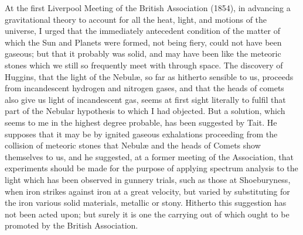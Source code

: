 \documentclass[a4paper, 11pt, oneside, english]{article}
\begin{document}
At the first Liverpool Meeting of the British Association (1854), in advancing a gravitational theory to account for all the heat, light, and motions of the universe, I urged that the immediately antecedent condition of the matter of which the Sun and Planets were formed, not being fiery, could not have been gaseous; but that it probably was solid, and may have been like the meteoric stones which we still so frequently meet with through space. The discovery of Huggins, that the light of the Nebulæ, so far as hitherto sensible to us, proceeds from incandescent hydrogen and nitrogen gases, and that the heads of comets also give us light of incandescent gas, seems at first sight literally to fulfil that part of the Nebular hypothesis to which I had objected. But a solution, which seems to me in the highest degree probable, has been suggested by Tait. He supposes that it may be by ignited gaseous exhalations proceeding from the collision of meteoric stones that Nebulæ and the heads of Comets show themselves to us, and he suggested, at a former meeting of the Association, that experiments should be made for the purpose of applying spectrum analysis to the light which has been observed in gunnery trials, such as those at Shoeburyness, when iron strikes against iron at a great velocity, but varied by substituting for the iron various solid materials, metallic or stony. Hitherto this suggestion has not been acted upon; but surely it is one the carrying out of which ought to be promoted by the British Association.
\end{document}
